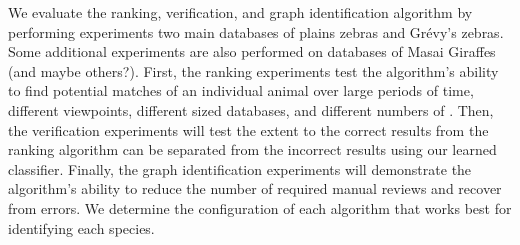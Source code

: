     We evaluate the ranking, verification, and graph identification algorithm by performing experiments two main
    databases of plains zebras and Grévy's zebras. Some additional experiments are also performed on databases of Masai
    Giraffes (and maybe others?). First, the ranking experiments test the algorithm's ability to find potential matches
    of an individual animal over large periods of time, different viewpoints, different sized databases, and different
    numbers of \exemplars{}. Then, the verification experiments will test the extent to the correct results from the
    ranking algorithm can be separated from the incorrect results using our learned classifier. Finally, the graph
    identification experiments will demonstrate the algorithm's ability to reduce the number of required manual reviews
    and recover from errors. We determine the configuration of each algorithm that works best for identifying each
    species.
    
    


